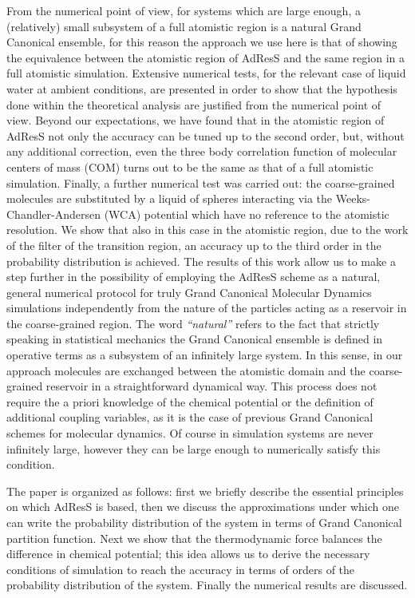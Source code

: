 \documentclass[aip,jcp,a4paper,reprint,onecolumn]{revtex4-1}
\newcommand{\redc}[1]{{\color{red} #1}}
\begin{document}
From the numerical point of view, for systems which are large enough, a (relatively) small subsystem of a full atomistic region is a 
natural Grand Canonical ensemble, for this reason the approach we use here is that of showing the equivalence between the atomistic region of AdResS and the same region in a full atomistic simulation.
Extensive numerical tests, for the relevant case of liquid water at ambient conditions, are presented in order to show that the hypothesis done within the theoretical analysis are justified from the numerical point of view. Beyond our expectations, we have found that in the atomistic region of AdResS not only the accuracy can be tuned up to the second order, but, without any additional correction, even the three body correlation function of molecular centers of mass (COM) turns out to be the same as that of a full atomistic simulation. Finally, a further numerical test was carried \redc{out}: the coarse-grained molecules are substituted by a liquid of spheres interacting via the Weeks-Chandler-Andersen (WCA)  potential \cite{wca} which have no reference to the atomistic resolution. We show that also in this case in the atomistic region, due to the work of the filter of the transition region, an accuracy up to the third order in the probability distribution is achieved.
The results of this work allow us to make a step further in the possibility of employing the AdResS scheme as a natural, general numerical protocol for truly Grand Canonical Molecular Dynamics simulations
independently from the nature of the particles acting as a reservoir in the coarse-grained region. The word {\it ``natural''} refers to the fact  that strictly speaking in statistical mechanics the Grand Canonical ensemble is defined in operative terms as a subsystem of an infinitely large system.  In this sense, in our approach molecules are exchanged between the atomistic domain and the coarse-grained reservoir in a straightforward dynamical way. This process does not require the a priori knowledge of the chemical potential or the definition of additional coupling variables, as it is the case of previous Grand Canonical schemes for molecular dynamics\cite{pet1,pet2,pet3,pet4,pet5,flo}.
Of course in simulation systems are never infinitely large, however they can be large enough to numerically satisfy this condition.

The paper is organized as follows: first we briefly describe the essential principles on which AdResS is based, then we discuss the approximations under which one can write the probability distribution of the system in terms of Grand Canonical partition function. Next we show that the thermodynamic force balances the difference in chemical potential; this idea allows us to derive the necessary conditions of simulation to reach the accuracy in terms of orders of the probability distribution of the system. 
Finally the numerical results are discussed.
\end{document}
